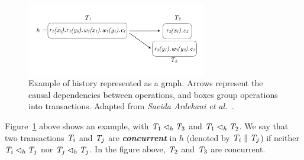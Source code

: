 \begin{figure}[h]
  \centering
  \vspace{-0.4cm}
  \includegraphics[width=0.7\textwidth]{figures/history.pdf}
  \vspace{-1cm}
  \caption{Example of history represented as a graph. Arrows represent the causal dependencies between operations, and boxes group operations into transactions. Adapted from \em{Saeida Ardekani et al.~\citep{ardekani_nmsi}}. }
  \label{fig:history}
\end{figure}

Figure~\ref{fig:history} above shows an example, with $\mathit{T}_1 \lhd_h \mathit{T}_3$ and $\mathit{T}_1 \lhd_h \mathit{T}_2$. We say that two transactions $\mathit{T}_i$ and $\mathit{T}_j$ are \textbf{\em concurrent} in $h$ (denoted by $\mathit{T}_i \parallel \mathit{T}_j$) if neither $\mathit{T}_i \lhd_h \mathit{T}_j$ nor $\mathit{T}_j \lhd_h \mathit{T}_j$. In the figure above, $\mathit{T}_2$ and $\mathit{T}_3$ are concurrent.





